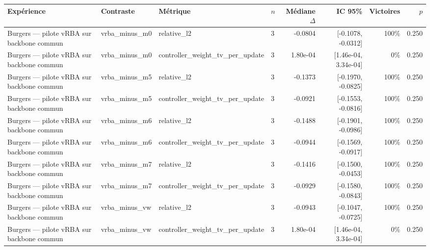 \begin{tabular}{llllrrrr}
\toprule
Expérience & Contraste & Métrique & $n$ & Médiane $\Delta$ & IC 95\% & Victoires & $p$ \\
\midrule
Burgers — pilote vRBA sur backbone commun & vrba\_minus\_m0 & relative\_l2 & 3 & -0.0804 & [-0.1078, -0.0312] & 100\% & 0.250 \\
Burgers — pilote vRBA sur backbone commun & vrba\_minus\_m0 & controller\_weight\_tv\_per\_update & 3 & 1.80e-04 & [1.46e-04, 3.34e-04] & 0\% & 0.250 \\
Burgers — pilote vRBA sur backbone commun & vrba\_minus\_m5 & relative\_l2 & 3 & -0.1373 & [-0.1970, -0.0825] & 100\% & 0.250 \\
Burgers — pilote vRBA sur backbone commun & vrba\_minus\_m5 & controller\_weight\_tv\_per\_update & 3 & -0.0921 & [-0.1553, -0.0816] & 100\% & 0.250 \\
Burgers — pilote vRBA sur backbone commun & vrba\_minus\_m6 & relative\_l2 & 3 & -0.1488 & [-0.1901, -0.0986] & 100\% & 0.250 \\
Burgers — pilote vRBA sur backbone commun & vrba\_minus\_m6 & controller\_weight\_tv\_per\_update & 3 & -0.0944 & [-0.1569, -0.0917] & 100\% & 0.250 \\
Burgers — pilote vRBA sur backbone commun & vrba\_minus\_m7 & relative\_l2 & 3 & -0.1416 & [-0.1500, -0.0453] & 100\% & 0.250 \\
Burgers — pilote vRBA sur backbone commun & vrba\_minus\_m7 & controller\_weight\_tv\_per\_update & 3 & -0.0929 & [-0.1580, -0.0843] & 100\% & 0.250 \\
Burgers — pilote vRBA sur backbone commun & vrba\_minus\_vw & relative\_l2 & 3 & -0.0943 & [-0.1047, -0.0725] & 100\% & 0.250 \\
Burgers — pilote vRBA sur backbone commun & vrba\_minus\_vw & controller\_weight\_tv\_per\_update & 3 & 1.80e-04 & [1.46e-04, 3.34e-04] & 0\% & 0.250 \\
\bottomrule
\end{tabular}
